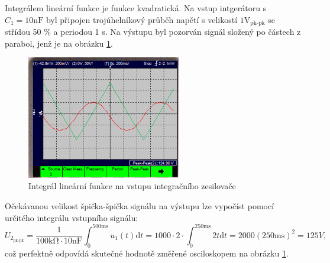\documentclass[twoside]{article}
\begin{document}
Integrálem lineární funkce je funkce kvadratická.
Na vstup intgerátoru s $C_1 = 10 \si{\nano\farad}$ byl připojen trojúhelníkový průběh napětí s velikostí $1 \si{\volt}_{\text{pk-pk}}$ se střídou 50 \% a periodou 1 s.
 Na výstupu byl pozorván signál složený po částech z parabol, jenž je na obrázku \ref{fig:kvadraticka}.

\begin{figure}[h!]
    \centering
    \includegraphics[width=0.6\textwidth]{kvadraticka.png}
    \caption{Integrál lineární funkce na vstupu integračního zesilovače}
    \label{fig:kvadraticka}
\end{figure}

Očekávanou velikost špička-špička signálu na výstupu lze vypočíst pomocí určitého integrálu vstupního signálu:
\begin{equation}
    U_{2_\text{pk-pk}} = \frac{1}{100 \si{\kilo\ohm} \cdot 10 \si{\nano\farad}} \int_0^{500 \si{\milli\second}} u_1(t) \text{d}t
    = 1000 \cdot 2 \cdot \int_0^{250 \si{\milli\second}} 2t \text{d}t = 2000 (250 \si{\milli\second})^2 = 125 V,
\end{equation}
což perfektně odpovídá skutečné hodnotě změřené osciloskopem na obrázku \ref{fig:kvadraticka}.
\end{document}
